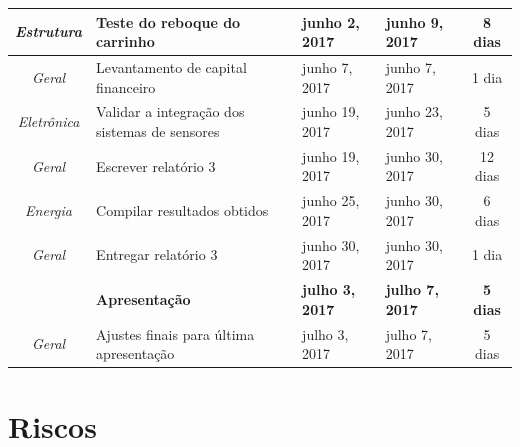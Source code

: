 \begin{longtable}{|c|m{6.5cm}|m{3.2cm}|m{3.2cm}|c|}
\textit{Estrutura}                                                        & Teste do reboque do carrinho                         & junho 2, 2017                        & junho 9, 2017                     & 8 dias                                \\ \hline
\textit{Geral}                                                            & Levantamento de capital financeiro                   & junho 7, 2017                        & junho 7, 2017                     & 1 dia                                 \\ \hline
\textit{Eletrônica}                                                       & Validar a integração dos sistemas de sensores        & junho 19, 2017                       & junho 23, 2017                    & 5 dias                                \\ \hline
\textit{Geral}                                                            & Escrever relatório 3                                 & junho 19, 2017                       & junho 30, 2017                    & 12 dias                               \\ \hline
\textit{Energia}                                                          & Compilar resultados obtidos                          & junho 25, 2017                       & junho 30, 2017                    & 6 dias                                \\ \hline
\textit{Geral}                                                            & Entregar relatório 3                                 & junho 30, 2017                       & junho 30, 2017                    & 1 dia                                 \\ \hline
\textit{\textbf{}}                                                        & \textbf{Apresentação}                                & \textbf{julho 3, 2017}               & \textbf{julho 7, 2017}            & \textbf{5 dias}                       \\ \hline
\textit{Geral}                                                            & Ajustes finais para última apresentação              & julho 3, 2017                        & julho 7, 2017                     & 5 dias                                \\ \hline
\end{longtable}


\section{Riscos}

